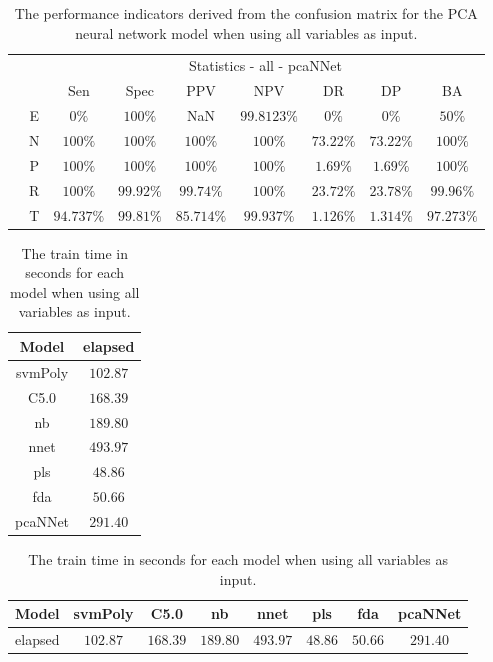 \begin{table}[!ht]
	\centering
	\begin{tabular}{|c|c|c|c|c|c|c|c|c|}
		\cline{3-9}
		\multicolumn{2}{c|}{} & \multicolumn{7}{c|}{Statistics - all - pcaNNet} \\ \cline{3-9}
		\multicolumn{2}{c|}{} & Sen & Spec & PPV & NPV & DR & DP & BA \\ \hline
		\multirow{5}{*}{\rotatebox{90}{Class}} & E & $0\%$ & $100\%$ & NaN & $99.8123\%$ & $0\%$ & $0\%$ & $50\%$ \\ \cline{2-9}
		 & N & $100\%$ & $100\%$ & $100\%$ & $100\%$ & $73.22\%$ & $73.22\%$ & $100\%$ \\ \cline{2-9}
		 & P & $100\%$ & $100\%$ & $100\%$ & $100\%$ & $1.69\%$ & $1.69\%$ & $100\%$ \\ \cline{2-9}
		 & R & $100\%$ & $99.92\%$ & $99.74\%$ & $100\%$ & $23.72\%$ & $23.78\%$ & $99.96\%$ \\ \cline{2-9}
		 & T & $94.737\%$ & $99.81\%$ & $85.714\%$ & $99.937\%$ & $1.126\%$ & $1.314\%$ & $97.273\%$ \\ \hline
	\end{tabular}
	\caption{The performance indicators derived from the confusion matrix for the PCA neural network model when using all variables as input.}
	\label{tab:cs:all:pcaNNet}
\end{table}

\begin{table}[!ht]
	\centering
	\begin{tabular}{|c|c|}
		\hline
		Model & elapsed \\ \hline
		svmPoly & $102.87$ \\ \hline
		C5.0 & $168.39$ \\ \hline
		nb & $189.80$ \\ \hline
		nnet & $493.97$ \\ \hline
		pls & $48.86$ \\ \hline
		fda & $50.66$ \\ \hline
		pcaNNet & $291.40$ \\ \hline
	\end{tabular}
	\caption{The train time in seconds for each model when using all variables as input.}
	\label{tab:time:all:train}
\end{table}

\begin{table}[!ht]
	\centering
	\begin{tabular}{|c|c|c|c|c|c|c|c|}
		\hline
		Model & svmPoly & C5.0 & nb & nnet & pls & fda & pcaNNet \\ \hline
		elapsed & $102.87$ & $168.39$ & $189.80$ & $493.97$ & $48.86$ & $50.66$ & $291.40$ \\ \hline
	\end{tabular}
	\caption{The train time in seconds for each model when using all variables as input.}
	\label{tab:time:reverse:all:train}
\end{table}


